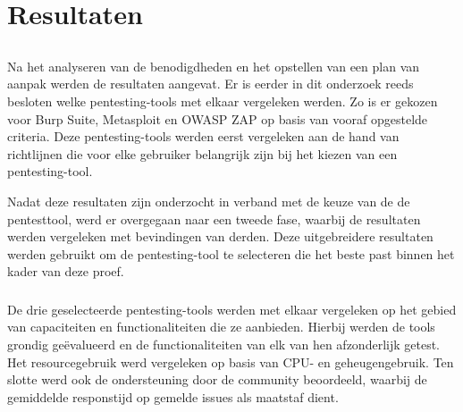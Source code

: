 
\chapter{Resultaten}%
\label{ch:resultaten}

\section{}
Na het analyseren van de benodigdheden en het opstellen van een plan van aanpak werden de resultaten aangevat. Er is 
eerder in dit onderzoek reeds besloten welke pentesting-tools met elkaar vergeleken werden. Zo is er gekozen voor Burp Suite, Metasploit en 
OWASP ZAP op basis van vooraf opgestelde criteria. Deze pentesting-tools werden eerst vergeleken aan de hand van richtlijnen 
die voor elke gebruiker belangrijk zijn bij het kiezen van een pentesting-tool.

Nadat deze resultaten zijn onderzocht in verband met de keuze van de de pentesttool, werd er overgegaan naar een tweede 
fase, waarbij de resultaten werden vergeleken met bevindingen van derden. Deze uitgebreidere resultaten werden gebruikt 
om de pentesting-tool te selecteren die het beste past binnen het kader van deze proef.

\subsection{}
De drie geselecteerde pentesting-tools werden met elkaar vergeleken op het gebied van capaciteiten en functionaliteiten die 
ze aanbieden. Hierbij werden de tools grondig geëvalueerd en de functionaliteiten van elk van hen afzonderlijk getest. Het 
resourcegebruik werd vergeleken op basis van CPU- en geheugengebruik. Ten slotte werd ook de ondersteuning door de 
community beoordeeld, waarbij de gemiddelde responstijd op gemelde issues als maatstaf dient.

